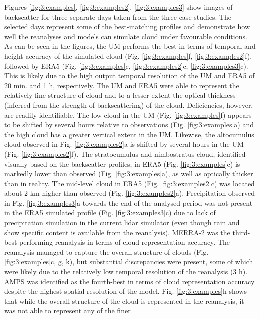 Figures \ref{fig:3:examples}, \ref{fig:3:examples2}, \ref{fig:3:examples3} show images of backscatter for three separate days taken from
the three case studies. The selected days represent some of the best-matching
profiles and demonstrate how well the reanalyses and models can simulate cloud under
favourable conditions. As can be seen in the figures, 
the UM performs the best
in terms of temporal and height accuracy of the simulated cloud
(Fig. \ref{fig:3:examples}f, \ref{fig:3:examples2}f), followed by ERA5
(Fig. \ref{fig:3:examples}c, \ref{fig:3:examples2}c, \ref{fig:3:examples3}c). This is likely
due to the high output temporal resolution of the UM and ERA5 of 20 min. and 1 h,
respectively.
The UM and ERA5 were able to represent the relatively fine structure of cloud and to a lesser extent
the optical thickness (inferred from the strength of backscattering) of the cloud.
Deficiencies, however, are readily
identifiable.
The low cloud in the UM (Fig. \ref{fig:3:examples}f) appears to be shifted by several
hours relative to observations (Fig. \ref{fig:3:examples}a) and the high cloud
has a greater vertical extent in the UM. Likewise, the altocumulus cloud
observed in Fig. \ref{fig:3:examples2}a is shifted by several hours in the UM
(Fig. \ref{fig:3:examples2}f). The stratocumulus and nimbostratus cloud, identified visually based on the backscatter profiles, in ERA5 (Fig. \ref{fig:3:examples}c)
is markedly lower than observed (Fig. \ref{fig:3:examples}a),
as well as optically thicker than in reality.
The mid-level cloud in ERA5 (Fig. \ref{fig:3:examples2}c) was located about 2 km higher than observed (Fig. \ref{fig:3:examples2}a).
Precipitation observed in Fig. \ref{fig:3:examples3}a towards the end of the analysed period was not present in the ERA5
simulated profile (Fig. \ref{fig:3:examples3}c) due to lack of precipitation simulation
in the current lidar simulator (even though rain and show specific content is available from the reanalysis).
MERRA-2 was the third-best performing
reanalysis in terms of cloud representation accuracy. The reanalysis managed
to capture the overall structure of clouds (Fig. \ref{fig:3:examples}c, g, k),
but substantial discrepancies were present, some of which were likely due to the
relatively low temporal resolution of the reanalysis (3 h). AMPS was
identified as the fourth-best in terms of cloud representation accuracy despite the highest spatial resolution of the model. Fig.
\ref{fig:3:examples}h shows that while the overall structure of the cloud is
represented in the reanalysis, it was not able to represent any of the finer
